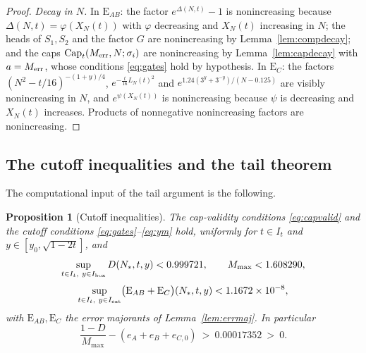 \documentclass[11pt]{article}
\newtheorem{proposition}[theorem]{Proposition}
\theoremstyle{definition}
\newcommand{\CapT}{\operatorname{Cap}}
\begin{document}
\begin{proof}
\emph{Decay in $N$.} In $\mathrm{E}_{AB}$: the factor
$e^{\Delta(N,t)}-1$ is nonincreasing because
$\Delta(N,t)=\varphi(X_N(t))$ with $\varphi$ decreasing and
$X_N(t)$ increasing in $N$; the heads of $S_1,S_2$ and the factor
$G$ are nonincreasing by Lemma~\ref{lem:compdecay}; and the caps
$\CapT_t(M_{\rm err},N;\sigma_i)$ are nonincreasing by
Lemma~\ref{lem:capdecay} with $a=M_{\rm err}$, whose conditions
\eqref{eq:gates} hold by hypothesis. In $\mathrm{E}_{C}$: the
factors $(N^2-t/16)^{-(1+y)/4}$, $e^{-\frac t{16}L_N(t)^2}$ and
$e^{1.24(3^y+3^{-y})/(N-0.125)}$ are visibly nonincreasing in $N$,
and $e^{\psi(X_N(t))}$ is nonincreasing because $\psi$ is
decreasing and $X_N(t)$ increases. Products of nonnegative
nonincreasing factors are nonincreasing.
\end{proof}

\subsection{The cutoff inequalities and the tail theorem}
\label{sec:tailcert}

The computational input of the tail argument is the following.

\begin{proposition}[Cutoff inequalities]
\label{prop:tailcert}
The cap-validity conditions \eqref{eq:capvalid} and the cutoff
conditions \eqref{eq:gates}--\eqref{eq:ym} hold, uniformly for
$t\in I_t$ and $y\in[y_0,\sqrt{1-2t}]$, and
\[
\sup_{t\in I_t,\ y\in I_{\rm box}}D(N_*,t,y)<0.999721,
\qquad
M_{\max}<1.608290,
\]
\[
\sup_{t\in I_t,\ y\in I_{\rm ext}}
\bigl(\mathrm{E}_{AB}+\mathrm{E}_{C}\bigr)(N_*,t,y)
<1.1672\times10^{-8},
\]
with $\mathrm{E}_{AB},\mathrm{E}_{C}$ the error majorants of
Lemma~\ref{lem:errmaj}. In particular
\[
\frac{1-D}{M_{\max}}-(e_A+e_B+e_{C,0})\ >\ 0.00017352\ >\ 0 .
\]
\end{proposition}
\end{document}
